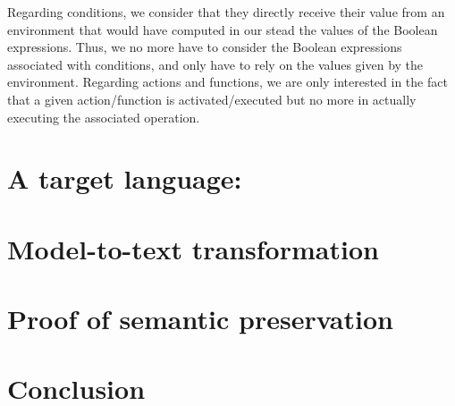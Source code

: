 \documentclass[pdflatex,sn-mathphys]{sn-jnl}%
\theoremstyle{thmstyleone}%
\theoremstyle{thmstyletwo}%
\theoremstyle{thmstylethree}%
\begin{document}

Regarding conditions, we consider that they directly receive their
value from an environment that would have computed in our stead the
values of the Boolean expressions. Thus, we no more have to consider
the Boolean expressions associated with conditions, and only have to
rely on the values given by the environment. Regarding actions and
functions, we are only interested in the fact that a given
action/function is activated/executed but no more in actually
executing the associated operation.

\section{A target language: \hvhdl{}}
\label{sec:hvhdl}

\section{Model-to-text transformation}
\label{sec:m2t}

\section{Proof of semantic preservation}
\label{sec:proof}

\section{Conclusion}
\label{sec:concl}



\end{document}
